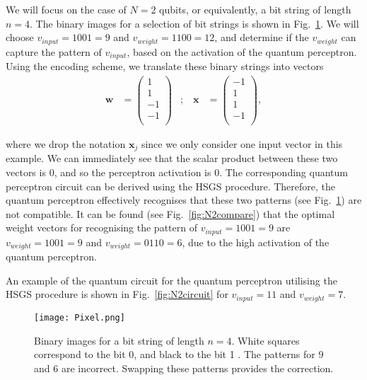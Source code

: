 \documentclass[twocolumn,superscriptaddress]{revtex4-1}
\begin{document}
We will focus on the case of $N=2$ qubits, or equivalently, a bit string of length $n=4$. The binary images for a selection of bit strings is shown in Fig.~\ref{fig:Pixel}. We will choose $v_{input} = 1001 = 9 $ and $v_{weight} = 1100 = 12$, and determine if the $v_{weight}$ can capture the pattern of $v_{input}$, based on the activation of the quantum perceptron. Using the encoding scheme, we translate these binary strings into vectors
\begin{equation} \label{eq:stringvector}
\begin{aligned}
\bm{w} &= 
\begin{pmatrix}
1 \\
1 \\
-1 \\
-1 \\
\end{pmatrix}
& ; \hspace{10pt}
\bm{x} &= 
\begin{pmatrix}
-1 \\
1 \\
1 \\
-1 \\
\end{pmatrix},
\end{aligned}
\end{equation}

where we drop the notation $\bm{x}_j$ since we only consider one input vector in this example. We can immediately see that the scalar product between these two vectors is $0$, and so the perceptron activation is $0$. The corresponding quantum perceptron circuit can be derived using the HSGS procedure. Therefore, the quantum perceptron effectively recognises that these two patterns (see Fig.~\ref{fig:Pixel}) are not compatible. It can be found (see Fig.~\ref{fig:N2compare}) that the optimal weight vectors for recognising the pattern of $v_{input} = 1001 = 9 $ are $v_{weight} = 1001 = 9 $ and $v_{weight} = 0110 = 6 $, due to the high activation of the quantum perceptron. 

An example of the quantum circuit for the quantum perceptron utilising the HSGS procedure is shown in Fig.~\ref{fig:N2circuit} for $v_{input} = 11 $ and $v_{weight} = 7$.

\begin{figure}[t!]
\texttt{[image: Pixel.png]}
\caption{Binary images for a bit string of length $n=4$. White squares correspond to the bit 0, and black to the bit 1 \cite{Tacchino_2019}. The patterns for $9$ and $6$ are incorrect. Swapping these patterns provides the correction.}
\label{fig:Pixel}
\end{figure}
\end{document}
